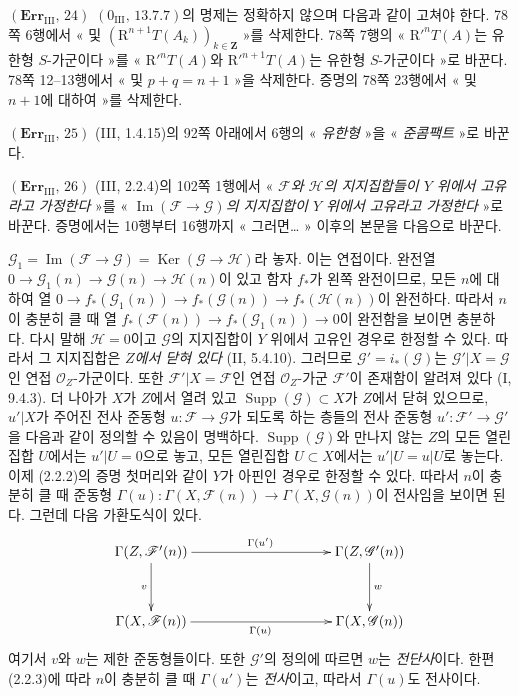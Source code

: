 \noindent\textbf{$(\mathbf{Err}_{\mathrm{III}},\,24)$}
$(0_{\mathrm{III}},\,13.7.7)$의 명제는 정확하지 않으며 다음과 같이
고쳐야 한다. 78쪽 6행에서 « 및
$(\mathrm R^{n+1}T(A_k))_{k\in\mathbf Z}$ »를 삭제한다. 78쪽 7행의
« $\mathrm R'^nT(A)$는 유한형 $S$-가군이다 »를
« $\mathrm R'^nT(A)$와 $\mathrm R'^{n+1}T(A)$는 유한형 $S$-가군이다 »로
바꾼다. 78쪽 12--13행에서 « 및 $p+q=n+1$ »을 삭제한다. 증명의
78쪽 23행에서 « 및 $n+1$에 대하여 »를 삭제한다.

\noindent\textbf{$(\mathbf{Err}_{\mathrm{III}},\,25)$}
(III, 1.4.15)의 92쪽 아래에서 6행의 « \emph{유한형} »을
« \emph{준콤팩트} »로 바꾼다.

\noindent\textbf{$(\mathbf{Err}_{\mathrm{III}},\,26)$}
(III, 2.2.4)의 102쪽 1행에서 « \emph{$\mathscr F$와 $\mathscr H$의
지지집합들이 $Y$ 위에서 고유라고 가정한다} »를
« \emph{$\operatorname{Im}(\mathscr F\to\mathscr G)$의 지지집합이
$Y$ 위에서 고유라고 가정한다} »로 바꾼다. 증명에서는 10행부터
16행까지 « 그러면\ldots{} » 이후의 본문을 다음으로 바꾼다.

$\mathscr G_1=\operatorname{Im}(\mathscr F\to\mathscr G)
=\operatorname{Ker}(\mathscr G\to\mathscr H)$라 놓자. 이는 연접이다.
완전열
$0\to\mathscr G_1(n)\to\mathscr G(n)\to\mathscr H(n)$이 있고 함자
$f_*$가 왼쪽 완전이므로, 모든 $n$에 대하여 열
$0\to f_*(\mathscr G_1(n))\to f_*(\mathscr G(n))
\to f_*(\mathscr H(n))$이 완전하다. 따라서 $n$이 충분히 클 때 열
$f_*(\mathscr F(n))\to f_*(\mathscr G_1(n))\to0$이 완전함을 보이면
충분하다. 다시 말해 $\mathscr H=0$이고 $\mathscr G$의 지지집합이
$Y$ 위에서 고유인 경우로 한정할 수 있다. 따라서 그 지지집합은
\emph{$Z$에서 닫혀 있다} (II, 5.4.10). 그러므로
$\mathscr G'=i_*(\mathscr G)$는 $\mathscr G'|X=\mathscr G$인 연접
$\mathscr O_Z$-가군이다. 또한 $\mathscr F'|X=\mathscr F$인 연접
$\mathscr O_Z$-가군 $\mathscr F'$이 존재함이 알려져 있다 (I, 9.4.3).
더 나아가 $X$가 $Z$에서 열려 있고
$\operatorname{Supp}(\mathscr G)\subset X$가 $Z$에서 닫혀 있으므로,
$u'|X$가 주어진 전사 준동형 $u:\mathscr F\to\mathscr G$가 되도록 하는
층들의 전사 준동형 $u':\mathscr F'\to\mathscr G'$을 다음과 같이
정의할 수 있음이 명백하다. $\operatorname{Supp}(\mathscr G)$와 만나지
않는 $Z$의 모든 열린집합 $U$에서는 $u'|U=0$으로 놓고, 모든 열린집합
$U\subset X$에서는 $u'|U=u|U$로 놓는다. 이제 (2.2.2)의 증명 첫머리와
같이 $Y$가 아핀인 경우로 한정할 수 있다. 따라서 $n$이 충분히 클 때
준동형
$\Gamma(u):\Gamma(X,\mathscr F(n))\to\Gamma(X,\mathscr G(n))$이
전사임을 보이면 된다. 그런데 다음 가환도식이 있다.
\[
\xymatrix@C=35mm@R=12mm{
\Gamma(Z,\mathscr F'(n)) \ar[r]^{\Gamma(u')} \ar[d]_v &
\Gamma(Z,\mathscr G'(n)) \ar[d]^w \\
\Gamma(X,\mathscr F(n)) \ar[r]_{\Gamma(u)} & \Gamma(X,\mathscr G(n))
}
\]
여기서 $v$와 $w$는 제한 준동형들이다. 또한 $\mathscr G'$의 정의에
따르면 $w$는 \emph{전단사}이다. 한편 (2.2.3)에 따라 $n$이 충분히
클 때 $\Gamma(u')$는 \emph{전사}이고, 따라서 $\Gamma(u)$도 전사이다.

